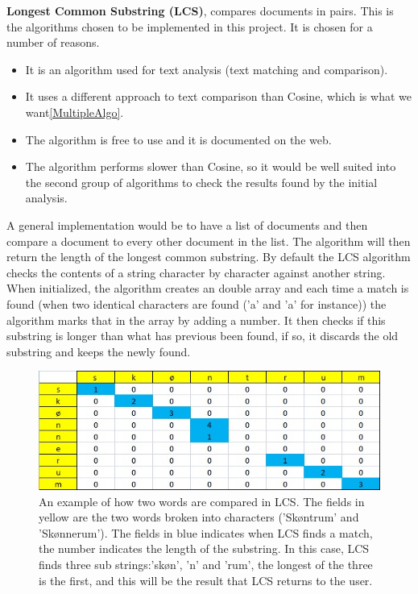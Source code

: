 \textbf{Longest Common Substring (LCS)}, compares documents in pairs. This is the algorithms chosen to be implemented in this project. It is chosen for a number of reasons. 

\begin{itemize}
	\item It is an algorithm used for text analysis (text matching and comparison).
	\item It uses a different approach to text comparison than Cosine, which is what we want\ref{MultipleAlgo}.
	\item The algorithm is free to use and it is documented on the web.
	\item The algorithm performs slower than Cosine, so it would be well suited into the second group of algorithms to check the results found by the initial analysis.
\end{itemize}

 A general implementation would be to have a list of documents and then compare a document to every other document in the list. The algorithm will then return the length of the longest common substring. By default the LCS algorithm\cite{WikiLCS} checks the contents of a string character by character against another string. When initialized, the algorithm creates an double array and each time a match is found (when two identical characters are found ('a' and 'a' for instance)) the algorithm marks that in the array by adding a number. It then checks if this substring is longer than what has previous been found, if so, it discards the old substring and keeps the newly found.

\begin{figure}[h]
	\centering
	\includegraphics[scale=0.75]{figures/LcsExplained}
	\caption{An example of how two words are compared in LCS. The fields in yellow are the two words broken into characters ('Skøntrum' and 'Skønnerum'). The fields in blue indicates when LCS finds a match, the number indicates the length of the substring. In this case, LCS finds three sub strings:'skøn', 'n' and 'rum', the longest of the three is the first, and this will be the result that LCS returns to the user. }
	\label{LcsExplained}
\end{figure}

